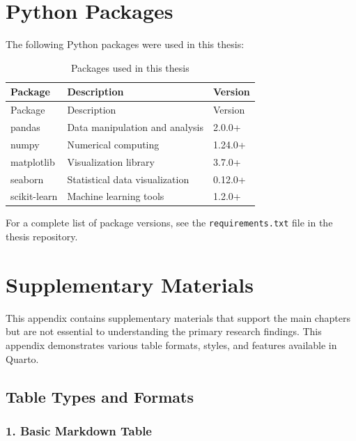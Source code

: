 \documentclass[
  letterpaper,
  oneside,
  openany]{MastersDoctoralThesis}
\begin{document}
\cleardoublepage
{}
{}
\appendix

\chapter{Python Packages}\label{sec-python-pkgs}

The following Python packages were used in this thesis:

\begin{longtable}[]{@{}lll@{}}
\caption{Packages used in this thesis}\label{tbl-pkgs}\tabularnewline
\toprule\noalign{}
Package & Description & Version \\
\midrule\noalign{}
\endfirsthead
\toprule\noalign{}
Package & Description & Version \\
\midrule\noalign{}
\endhead
\bottomrule\noalign{}
\endlastfoot
pandas & Data manipulation and analysis & 2.0.0+ \\
numpy & Numerical computing & 1.24.0+ \\
matplotlib & Visualization library & 3.7.0+ \\
seaborn & Statistical data visualization & 0.12.0+ \\
scikit-learn & Machine learning tools & 1.2.0+ \\
\end{longtable}

For a complete list of package versions, see the
\texttt{requirements.txt} file in the thesis repository.

\chapter{Supplementary Materials}\label{sec-app-b}

This appendix contains supplementary materials that support the main
chapters but are not essential to understanding the primary research
findings. This appendix demonstrates various table formats, styles, and
features available in Quarto.

\section{Table Types and Formats}\label{sec-app-b-tables}

\subsection{1. Basic Markdown Table}\label{sec-app-b-basic}
\end{document}
